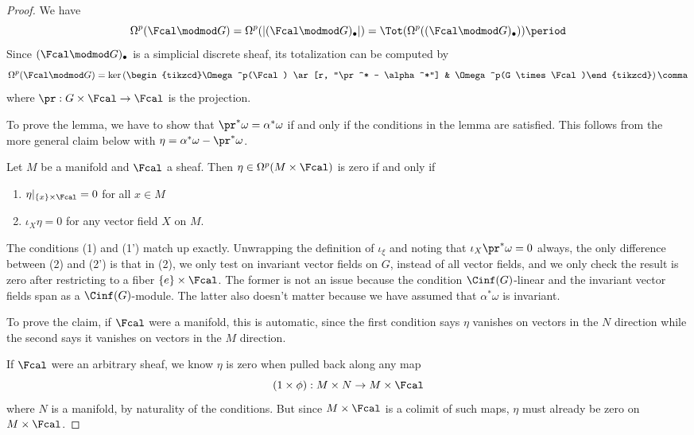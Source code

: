 \begin{proof}
  We have
  \begin{equation*}
    \Omega^p (\Fcal \modmod G) = \Omega^p(|(\Fcal\modmod G)_\bullet|) = \Tot(\Omega^p((\Fcal\modmod G)_\bullet))\period
  \end{equation*}
  Since $(\Fcal\modmod G)_\bullet$ is a simplicial discrete sheaf, its totalization can be computed by
    \begin{equation*}
      \Omega^p(\Fcal\modmod G) = \ker \left(\begin{tikzcd}\Omega^p(\Fcal) \ar[r, "\pr^* - \alpha^*"] & \Omega^p(G \times \Fcal)\end{tikzcd}\right) \comma
    \end{equation*}
  where $\pr: G \times \Fcal \to \Fcal$ is the projection.

  To prove the lemma, we have to show that $\pr^* \omega = \alpha^* \omega$ if and only if the conditions in the lemma are satisfied. This follows from the more general claim below with $\eta = \alpha^* \omega - \pr^* \omega$.
  \begin{claim}
    Let $M$ be a manifold and $\Fcal$ a sheaf. 
    Then $\eta \in \Omega^p(M \times \Fcal)$ is zero if and only if
    \begin{enumerate}[{\upshape (1)}]
      \item $\eta|_{\{x\} \times \Fcal} = 0$ for all $x \in M$
      
      \item $\iota_X \eta = 0$ for any vector field $X$ on $M$.
    \end{enumerate}
  \end{claim}

  The conditions (1) and (1') match up exactly. Unwrapping the definition of $\iota_\xi$ and noting that $\iota_X \pr^* \omega = 0$ always, the only difference between (2) and (2') is that in (2), we only test on invariant vector fields on $G$, instead of all vector fields, and we only check the result is zero after restricting to a fiber $\{e\} \times \Fcal$. The former is not an issue because the condition $\Cinf(G)$-linear and the invariant vector fields span as a $\Cinf(G)$-module. The latter also doesn't matter because we have assumed that $\alpha^* \omega$ is invariant. 

  To prove the claim, if $\Fcal$ were a manifold, this is automatic, since the first condition says $\eta$ vanishes on vectors in the $N$ direction while the second says it vanishes on vectors in the $M$ direction.

  If $\Fcal$ were an arbitrary sheaf, we know $\eta$ is zero when pulled back along any map 
  \begin{equation*}(1 \times \phi): M \times N \to M \times \Fcal\end{equation*}
   where $N$ is a manifold, by naturality of the conditions. But since $M \times \Fcal$ is a colimit of such maps, $\eta$ must already be zero on $M \times \Fcal$.
\end{proof}

